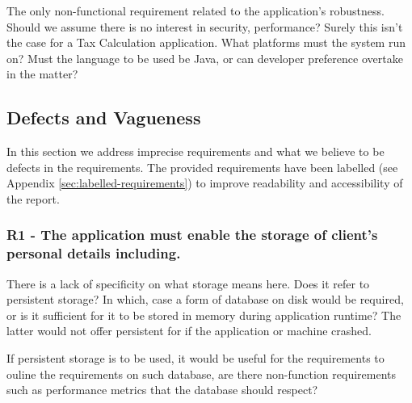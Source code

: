 The only non-functional requirement related to the application's robustness. Should we assume there is no interest in security, performance? Surely this isn't the case for a Tax Calculation application. What platforms must the system run on? Must the language to be used be Java, or can developer preference overtake in the matter? 
\par





\subsection{Defects and Vagueness}

In this section we address imprecise requirements and what we believe to be defects in the requirements. The provided requirements have been labelled (see Appendix \ref{sec:labelled-requirements}) to improve readability and accessibility of the report. 

\subsubsection{R1 - The application must enable the storage of client’s personal details including. }

There is a lack of specificity on what storage means here. Does it refer to persistent storage? In which, case a form of database on disk would be required, or is it sufficient for it to be stored in memory during application runtime? The latter would not offer persistent for if the application or machine crashed.  

If persistent storage is to be used, it would be useful for the requirements to ouline the requirements on such database, are there non-function requirements such as performance metrics that the database should respect? 

